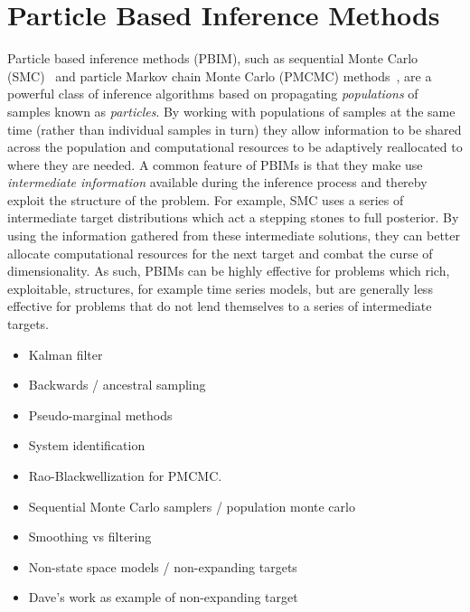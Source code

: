 
\chapter{Particle Based Inference Methods}
\label{sec:part}

Particle based inference methods (PBIM), such as sequential Monte Carlo (SMC)~\citep{gordon1993novel,doucet2001introduction} and 
particle Markov chain Monte Carlo (PMCMC) methods~\citep{andrieu2009pseudo,rainforth2016interacting},
are a powerful class of inference algorithms based on propagating \emph{populations} of samples
known as \emph{particles}.  By working with populations of samples at the same time (rather than individual
samples in turn) they allow information to be shared across the population and computational
resources to be adaptively reallocated to where they are needed.  A common feature of PBIMs is
that they make use \emph{intermediate information} available during the inference process and thereby
exploit the structure of the problem.  For example, SMC uses a series of intermediate target distributions
which act a stepping stones to full posterior.  By using the information gathered from these intermediate
solutions, they can better allocate computational resources for the next target and combat the curse of
dimensionality.  As such, PBIMs can be highly effective for problems which rich, exploitable, structures, 
for example time series models, but are generally less effective for problems that do not lend themselves
to a series of intermediate targets.





\begin{itemize}
	\item Kalman filter
	\item Backwards / ancestral sampling
	\item Pseudo-marginal methods
	\item System identification
	\item Rao-Blackwellization for PMCMC.
	\item Sequential Monte Carlo samplers / population monte carlo
	\item Smoothing vs filtering
	\item Non-state space models / non-expanding targets
	\item Dave's work as example of non-expanding target
\end{itemize}